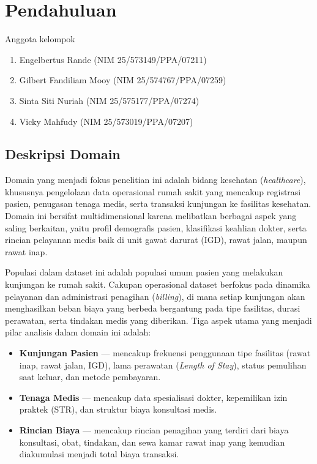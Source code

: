 
\chapter{ Pendahuluan}
\begin{mybox}{Anggota kelompok}
\begin{enumerate}
    \itemsep0em
	\item Engelbertus Rande (NIM 25/573149/PPA/07211)
	\item Gilbert Fandiliam Mooy (NIM 25/574767/PPA/07259)
	\item Sinta Siti Nuriah (NIM 25/575177/PPA/07274)
	\item Vicky Mahfudy (NIM 25/573019/PPA/07207)
\end{enumerate}
\end{mybox}


 
 
\section{Deskripsi Domain}
 
Domain yang menjadi fokus penelitian ini adalah bidang kesehatan (\textit{healthcare}), khususnya pengelolaan data operasional rumah sakit yang mencakup registrasi pasien, penugasan tenaga medis, serta transaksi kunjungan ke fasilitas kesehatan. Domain ini bersifat multidimensional karena melibatkan berbagai aspek yang saling berkaitan, yaitu profil demografis pasien, klasifikasi keahlian dokter, serta rincian pelayanan medis baik di unit gawat darurat (IGD), rawat jalan, maupun rawat inap.
 
Populasi dalam dataset ini adalah populasi umum pasien yang melakukan kunjungan ke rumah sakit. Cakupan operasional dataset berfokus pada dinamika pelayanan dan administrasi penagihan (\textit{billing}), di mana setiap kunjungan akan menghasilkan beban biaya yang berbeda bergantung pada tipe fasilitas, durasi perawatan, serta tindakan medis yang diberikan. Tiga aspek utama yang menjadi pilar analisis dalam domain ini adalah:
 
\begin{itemize}
    \item \textbf{Kunjungan Pasien} --- mencakup frekuensi penggunaan tipe fasilitas (rawat inap, rawat jalan, IGD), lama perawatan (\textit{Length of Stay}), status pemulihan saat keluar, dan metode pembayaran.
    \item \textbf{Tenaga Medis} --- mencakup data spesialisasi dokter, kepemilikan izin praktek (STR), dan struktur biaya konsultasi medis.
    \item \textbf{Rincian Biaya} --- mencakup rincian penagihan yang terdiri dari biaya konsultasi, obat, tindakan, dan sewa kamar rawat inap yang kemudian diakumulasi menjadi total biaya transaksi.
\end{itemize}
 
